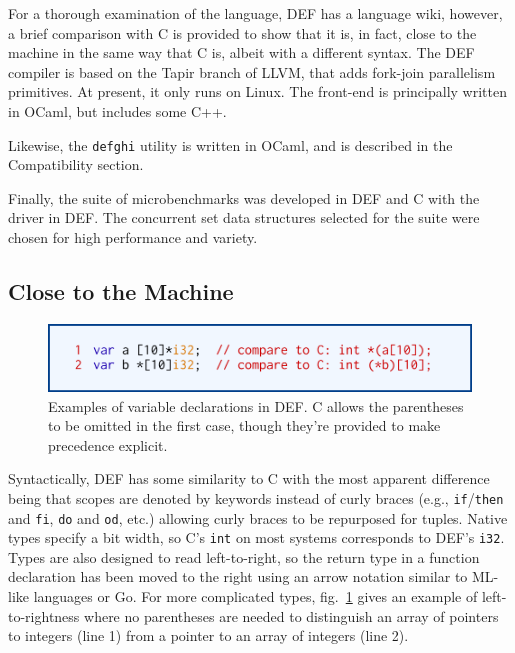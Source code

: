 For a thorough examination of the language, DEF has a language wiki,\cite{DEFWiki} however, a brief comparison with C is provided to show that it is, in fact, close to the machine in the same way that C is, albeit with a different syntax.  The DEF compiler is based on the Tapir branch of LLVM, that adds fork-join parallelism primitives.\cite{TAPIR,LLVM}  At present, it only runs on Linux.  The front-end is principally written in OCaml, but includes some C++.

Likewise, the \texttt{defghi} utility is written in OCaml,\cite{DEF} and is described in the Compatibility section.

Finally, the suite of microbenchmarks was developed in DEF and C with the driver in DEF.  The concurrent set data structures selected for the suite were chosen for high performance and variety.

\subsection{Close to the Machine}

\begin{figure}[htbp!]
        \centering
        \includegraphics[scale=0.25]{gfx/types}
        \caption{Examples of variable declarations in DEF.  C allows the parentheses to be omitted in the first case, though they're provided to make precedence explicit.}
        \label{fig:types}
\end{figure}

Syntactically, DEF has some similarity to C with the most apparent difference being that scopes are denoted by keywords instead of curly braces (e.g., \texttt{if}/\texttt{then} and \texttt{fi}, \texttt{do} and \texttt{od}, etc.) allowing curly braces to be repurposed for tuples.  Native types specify a bit width, so C's \texttt{int} on most systems corresponds to DEF's \texttt{i32}.  Types are also designed to read left-to-right, so the return type in a function declaration has been moved to the right using an arrow notation similar to ML-like languages or Go.  For more complicated types, fig.~\ref{fig:types} gives an example of left-to-rightness where no parentheses are needed to distinguish an array of pointers to integers (line 1) from a pointer to an array of integers (line 2).

